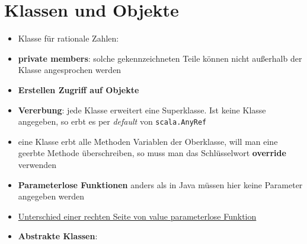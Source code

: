 \pagebreak


\section{Klassen und Objekte}
\begin{itemize}
  \item Klasse für rationale Zahlen:
  
  
  
  \item \textbf{private members}: solche gekennzeichneten Teile können nicht
  außerhalb der Klasse angesprochen werden
  \item \textbf{Erstellen \und Zugriff auf Objekte}
  
  
  \item \textbf{Vererbung}: jede Klasse erweitert eine Superklasse. Ist
  keine Klasse angegeben, so erbt es per \textit{default} von
  \texttt{scala.AnyRef}
  
  
  
  \item eine Klasse erbt alle Methoden \und Variablen der Oberklasse, will
  man eine geerbte Methode überschreiben, so muss man das Schlüsselwort
  \textbf{override} verwenden
  
  
  
  \item \textbf{Parameterlose Funktionen} anders als in Java müssen hier keine
  Parameter angegeben werden
  
  
  
  \item \uline{Unterschied einer rechten Seite von value \und parameterlose Funktion}
  \item \textbf{Abstrakte Klassen}: 
  

\end{itemize}
